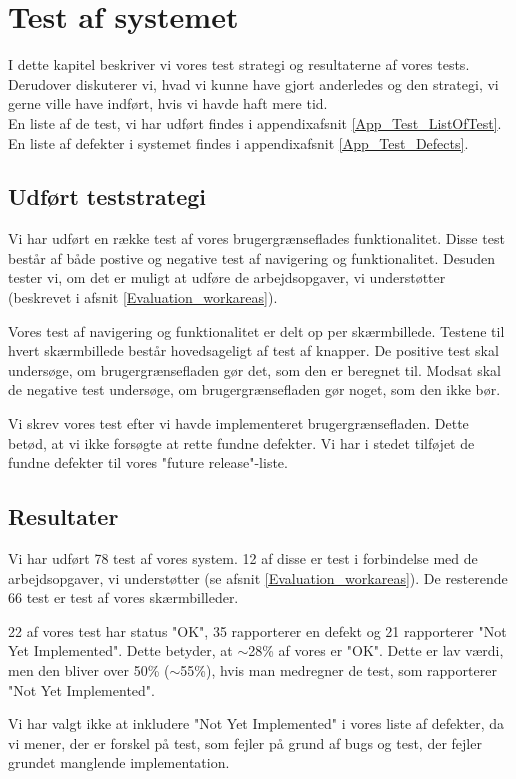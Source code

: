 \chapter{Test af systemet}
\label{Test}
I dette kapitel beskriver vi vores test strategi og resultaterne af vores tests. Derudover diskuterer vi, hvad vi kunne have gjort anderledes og den strategi, vi gerne ville have indført, hvis vi havde haft mere tid.
\\En liste af de test, vi har udført findes i appendixafsnit \ref{App_Test_ListOfTest}. En liste af defekter i systemet findes i appendixafsnit \ref{App_Test_Defects}.

\section{Udført teststrategi}
\label{Test_strat}
Vi har udført en række test af vores brugergrænseflades funktionalitet. Disse test består af både postive og negative test af navigering og funktionalitet. Desuden tester vi, om det er muligt at udføre de arbejdsopgaver, vi understøtter (beskrevet i afsnit \ref{Evaluation_workareas}).

Vores test af navigering og funktionalitet er delt op per skærmbillede. Testene til hvert skærmbillede består hovedsageligt af test af knapper. De positive test skal undersøge, om brugergrænsefladen gør det, som den er beregnet til. Modsat skal de negative test undersøge, om brugergrænsefladen gør noget, som den ikke bør.

Vi skrev vores test efter vi havde implementeret brugergrænsefladen. Dette betød, at vi ikke forsøgte at rette fundne defekter. Vi har i stedet  tilføjet de fundne defekter til vores "future release"-liste.

\section{Resultater}
\label{Test_Results}
Vi har udført 78 test af vores system. 12 af disse er test i forbindelse med de arbejdsopgaver, vi understøtter (se afsnit \ref{Evaluation_workareas}). De resterende 66 test er test af vores skærmbilleder.

22 af vores test har status "OK", 35 rapporterer en defekt og 21 rapporterer "Not Yet Implemented". Dette betyder, at $\sim$28\% af vores er "OK". Dette er lav værdi, men den bliver over 50\% ($\sim$55\%), hvis man medregner de test, som rapporterer "Not Yet Implemented". 

Vi har valgt ikke at inkludere "Not Yet Implemented" i vores liste af defekter, da vi mener, der er forskel på test, som fejler på grund af bugs og test, der fejler grundet manglende implementation. 

